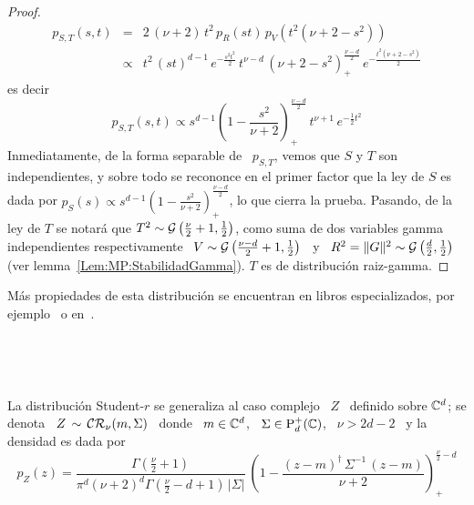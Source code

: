\begin{proof}
\begin{eqnarray*}
  p_{S,T}(s,t) & = & 2 \, (\nu+2) \, t^2 \, p_R(st) \, p_V\left( t^2 (\nu+2-s^2)
  \right)\\[2mm]
  & \propto & t^2 \, (s t)^{d-1} \, e^{-\frac{s^2 t^2}{2}} \, t^{\nu-d} \,
  \left( \nu+2-s^2 \right)_+^{\frac{\nu-d}{2}} \, e^{-\frac{t^2 (\nu+2-s^2)}{2}}
  \end{eqnarray*}
  es decir
  \[
  p_{S,T}(s,t)     \propto    s^{d-1}     \left(    1     -    \frac{s^2}{\nu+2}
  \right)_+^{\frac{\nu-d}{2}} \, t^{\nu+1} \, e^{-\frac12 t^2}
    \]
    Inmediatamente, de  la forma separable de  \ $p_{S,T}$, vemos que  $S$ y $T$
    son independientes, y sobre todo se recononce en el primer factor que la ley
    de  $S$ es dada  por $p_S(s)  \propto s^{d-1}  \left( 1  - \frac{s^2}{\nu+2}
    \right)_+^{\frac{\nu-d}{2}}$, lo que cierra la prueba. Pasando, de la ley de
    $T$ se notar\'a que $T^2 \sim \mathcal{G}\left( \frac{\nu}{2} + 1 , \frac12 \right)$,
    como suma  de dos variables  gamma independientes respectivamente \  $V \sim
    \mathcal{G}\left(  \frac{\nu-d}{2}+1 , \frac12  \right)$ \  y \  $R^2 =  \|G\|^2 \sim
    \mathcal{G}\left(        \frac{d}{2}       ,       \frac12        \right)$       (ver
    lemma~\ref{Lem:MP:StabilidadGamma}). $T$ es de distribuci\'on raiz-gamma.
\end{proof}

M\'as propiedades de esta distribuci\'on se encuentran en libros especializados,
por ejemplo~\cite{FanKot90, KotBal00} o en~\cite[Sec.~3.2.1]{Zoz12}.

\

\

La distribuci\'on  Student-$r$ se generaliza al  caso complejo \  $Z$ \ definido
sobre $\mathbb{C}^d$; se denota  \ $Z \, \sim \, \mathcal{CR}_\nu(m,\Sigma)$ \  donde \ $m \in
\mathbb{C}^d$, \ $\Sigma \in \mathrm{P}_d^+(\mathbb{C})$, \ $\nu > 2 d - 2$ \ y la densidad es dada
por \
%
\[
p_Z(z) = \frac{\Gamma\left( \frac{\nu}{2} + 1 \right)}{\pi^d (\nu+2)^d \Gamma\left(
    \frac{\nu}{2} - d + 1   \right)  \,   \left|   \Sigma  \right|}   \:   \left(  1   -
  \frac{(z-m)^\dag \, \Sigma^{-1} \, (z-m)}{\nu+2} \right)_+^{\frac{\nu}{2}-d}
\]

\

